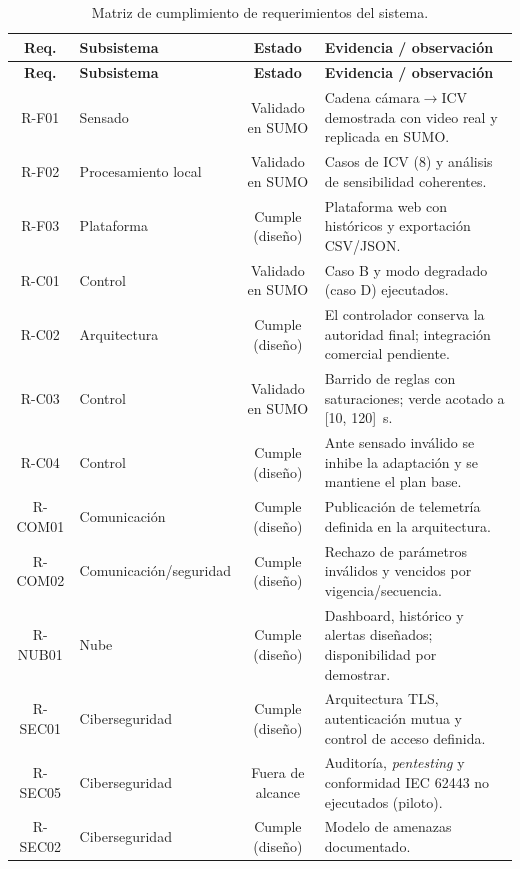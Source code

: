 \begin{landscape}
\footnotesize
\begin{longtable}{@{}c p{4.2cm} c p{9.5cm}@{}}
\caption{Matriz de cumplimiento de requerimientos del sistema.}\label{tab:cumplimiento}\\
\toprule
\textbf{Req.} & \textbf{Subsistema} & \textbf{Estado} & \textbf{Evidencia / observación}\\
\midrule
\endfirsthead
\toprule
\textbf{Req.} & \textbf{Subsistema} & \textbf{Estado} & \textbf{Evidencia / observación}\\
\midrule
\endhead
\bottomrule
\endfoot
R-F01   & Sensado            & Validado en SUMO   & Cadena cámara$\rightarrow$ICV demostrada con video real y replicada en SUMO.\\
R-F02   & Procesamiento local & Validado en SUMO  & Casos de ICV (8) y análisis de sensibilidad coherentes.\\
R-F03   & Plataforma         & Cumple (diseño)    & Plataforma web con históricos y exportación CSV/JSON.\\
R-C01   & Control            & Validado en SUMO   & Caso B y modo degradado (caso D) ejecutados.\\
R-C02   & Arquitectura       & Cumple (diseño)    & El controlador conserva la autoridad final; integración comercial pendiente.\\
R-C03   & Control            & Validado en SUMO   & Barrido de reglas con saturaciones; verde acotado a [10, 120]~s.\\
R-C04   & Control            & Cumple (diseño)    & Ante sensado inválido se inhibe la adaptación y se mantiene el plan base.\\
R-COM01 & Comunicación       & Cumple (diseño)    & Publicación de telemetría definida en la arquitectura.\\
R-COM02 & Comunicación/seguridad & Cumple (diseño) & Rechazo de parámetros inválidos y vencidos por vigencia/secuencia.\\
R-NUB01 & Nube               & Cumple (diseño)    & Dashboard, histórico y alertas diseñados; disponibilidad por demostrar.\\
R-SEC01 & Ciberseguridad     & Cumple (diseño)    & Arquitectura TLS, autenticación mutua y control de acceso definida.\\
R-SEC05 & Ciberseguridad     & Fuera de alcance   & Auditoría, \textit{pentesting} y conformidad IEC 62443 no ejecutados (piloto).\\
R-SEC02 & Ciberseguridad     & Cumple (diseño)    & Modelo de amenazas documentado.\\

\end{longtable}
\end{landscape}
